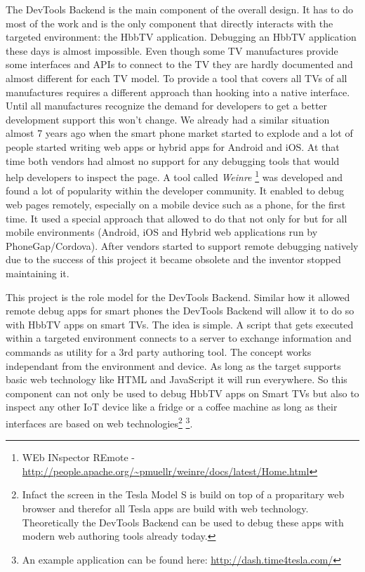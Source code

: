 The DevTools Backend is the main component of the overall design. It has to do most of the work and
is the only component that directly interacts with the targeted environment: the HbbTV application.
Debugging an HbbTV application these days is almost impossible. Even though some TV manufactures
provide some interfaces and APIs to connect to the TV they are hardly documented and almost different
for each TV model. To provide a tool that covers all TVs of all manufactures requires a different
approach than hooking into a native interface. Until all manufactures recognize the demand for
developers to get a better development support this won't change. We already had a similar situation
almost 7 years ago when the smart phone market started to explode and a lot of people started writing
web apps or hybrid apps for Android and iOS. At that time both vendors had almost no support for
any debugging tools that would help developers to inspect the page. A tool called \textit{Weinre}
\footnote{WEb INspector REmote - \url{http://people.apache.org/~pmuellr/weinre/docs/latest/Home.html}}
was developed and found a lot of popularity within the developer community. It enabled to debug web
pages remotely, especially on a mobile device such as a phone, for the first time. It used a special
approach that allowed to do that not only for but for all mobile environments (Android, iOS and
Hybrid web applications run by PhoneGap/Cordova). After vendors started to support remote debugging
natively due to the success of this project it became obsolete and the inventor stopped maintaining
it.

This project is the role model for the DevTools Backend. Similar how it allowed remote debug apps
for smart phones the DevTools Backend will allow it to do so with HbbTV apps on smart TVs. The idea
is simple. A script that gets executed within a targeted environment connects to a server to
exchange information and commands as utility for a 3rd party authoring tool. The concept works
independant from the environment and device. As long as the target supports basic web technology
like HTML and JavaScript it will run everywhere. So this component can not only be used to debug HbbTV
apps on Smart TVs but also to inspect any other IoT device like a fridge or a coffee machine as long
as their interfaces are based on web technologies\footnote{Infact the screen in the Tesla Model S
is build on top of a proparitary web browser and therefor all Tesla apps are build with web
technology. Theoretically the DevTools Backend can be used to debug these apps with modern web
authoring tools already today.} \footnote{An example application can be found here: \url{http://dash.time4tesla.com/}}.

